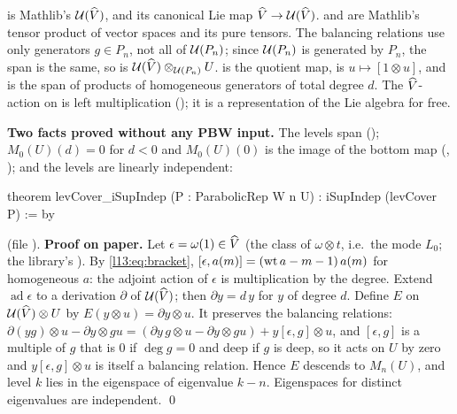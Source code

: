 \begin{dictionary}
 is Mathlib's $\mathcal{U}(\widehat{V})$, and  its
canonical Lie map $\widehat{V}\to\mathcal{U}(\widehat{V})$.  and  are Mathlib's tensor product of
vector spaces and its pure tensors. The balancing relations use only generators $g\in P_n$, not all of
$\mathcal{U}(P_n)$; since $\mathcal{U}(P_n)$ is generated by $P_n$, the span is the same, so  is
$\mathcal{U}(\widehat{V})\otimes_{\mathcal{U}(P_n)}U$.  is the quotient map,  is
$u\mapsto[1\otimes u]$, and  is the span of products of homogeneous generators of total degree $d$.
The $\widehat{V}$-action on  is left multiplication (); it is a representation of the Lie algebra
for free.

\textbf{Two facts proved without any PBW input.} The levels span (); $M_0(U)(d) = 0$ for $d<0$
and $M_0(U)(0)$ is the image of the bottom map (, ); and the
levels are linearly independent:
\end{dictionary}

\begin{leancode}
theorem levCover_iSupIndep (P : ParabolicRep W n U) : iSupIndep (levCover P) := by
\end{leancode}
\noindent (file ).
\textbf{Proof on paper.} Let $\epsilon = \omega(1)\in\widehat{V}$ (the class of $\omega\otimes t$, i.e.\ the mode $L_0$; the
library's ). By \eqref{l13:eq:bracket}, $[\epsilon,a(m)] = (\operatorname{wt} a-m-1)\,a(m)$ for homogeneous $a$: the
adjoint action of $\epsilon$ is multiplication by the degree. Extend $\operatorname{ad}\epsilon$ to a derivation $\partial$ of
$\mathcal{U}(\widehat{V})$; then $\partial y = d\,y$ for $y$ of degree $d$. Define $E$ on $\mathcal{U}(\widehat{V})\otimes U$ by
$E(y\otimes u) = \partial y\otimes u$. It preserves the balancing relations: $\partial(yg)\otimes u - \partial y\otimes gu =
(\partial y\,g\otimes u - \partial y\otimes gu) + y[\epsilon,g]\otimes u$, and $[\epsilon,g]$ is a multiple of $g$ that is $0$ if
$\deg g = 0$ and deep if $g$ is deep, so it acts on $U$ by zero and $y[\epsilon,g]\otimes u$ is itself a balancing relation. Hence
$E$ descends to $M_n(U)$, and level $k$ lies in the eigenspace of eigenvalue $k-n$. Eigenspaces for distinct eigenvalues are
independent. \qed

